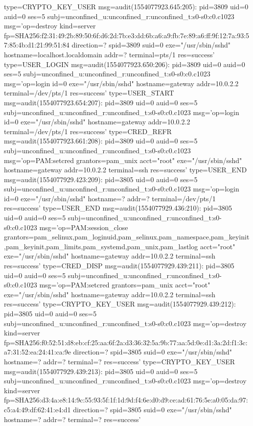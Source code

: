 \documentclass[]{report}
\newenvironment{Shaded}{}{}
\newcommand{\NormalTok}[1]{#1}
\begin{document}
\begin{Shaded}
\begin{Highlighting}[]
\NormalTok{type=CRYPTO_KEY_USER msg=audit(1554077923.645:205): pid=3809 uid=0 auid=0 ses=5 subj=unconfined_u:unconfined_r:unconfined_t:s0-s0:c0.c1023 msg='op=destroy kind=server fp=SHA256:f2:31:49:2b:89:50:6f:d6:2d:7b:e3:dd:6b:a6:a9:fb:7e:89:a6:ff:9f:12:7a:93:57:85:4b:d1:21:99:51:84 direction=? spid=3809 suid=0  exe="/usr/sbin/sshd" hostname=localhost.localdomain addr=? terminal=pts/1 res=success'}
\NormalTok{type=USER_LOGIN msg=audit(1554077923.650:206): pid=3809 uid=0 auid=0 ses=5 subj=unconfined_u:unconfined_r:unconfined_t:s0-s0:c0.c1023 msg='op=login id=0 exe="/usr/sbin/sshd" hostname=gateway addr=10.0.2.2 terminal=/dev/pts/1 res=success'}
\NormalTok{type=USER_START msg=audit(1554077923.654:207): pid=3809 uid=0 auid=0 ses=5 subj=unconfined_u:unconfined_r:unconfined_t:s0-s0:c0.c1023 msg='op=login id=0 exe="/usr/sbin/sshd" hostname=gateway addr=10.0.2.2 terminal=/dev/pts/1 res=success'}
\NormalTok{type=CRED_REFR msg=audit(1554077923.661:208): pid=3809 uid=0 auid=0 ses=5 subj=unconfined_u:unconfined_r:unconfined_t:s0-s0:c0.c1023 msg='op=PAM:setcred grantors=pam_unix acct="root" exe="/usr/sbin/sshd" hostname=gateway addr=10.0.2.2 terminal=ssh res=success'}
\NormalTok{type=USER_END msg=audit(1554077929.423:209): pid=3805 uid=0 auid=0 ses=5 subj=unconfined_u:unconfined_r:unconfined_t:s0-s0:c0.c1023 msg='op=login id=0 exe="/usr/sbin/sshd" hostname=? addr=? terminal=/dev/pts/1 res=success'}
\NormalTok{type=USER_END msg=audit(1554077929.436:210): pid=3805 uid=0 auid=0 ses=5 subj=unconfined_u:unconfined_r:unconfined_t:s0-s0:c0.c1023 msg='op=PAM:session_close grantors=pam_selinux,pam_loginuid,pam_selinux,pam_namespace,pam_keyinit,pam_keyinit,pam_limits,pam_systemd,pam_unix,pam_lastlog acct="root" exe="/usr/sbin/sshd" hostname=gateway addr=10.0.2.2 terminal=ssh res=success'}
\NormalTok{type=CRED_DISP msg=audit(1554077929.439:211): pid=3805 uid=0 auid=0 ses=5 subj=unconfined_u:unconfined_r:unconfined_t:s0-s0:c0.c1023 msg='op=PAM:setcred grantors=pam_unix acct="root" exe="/usr/sbin/sshd" hostname=gateway addr=10.0.2.2 terminal=ssh res=success'}
\NormalTok{type=CRYPTO_KEY_USER msg=audit(1554077929.439:212): pid=3805 uid=0 auid=0 ses=5 subj=unconfined_u:unconfined_r:unconfined_t:s0-s0:c0.c1023 msg='op=destroy kind=server fp=SHA256:f0:52:51:d8:eb:cf:25:aa:6f:2a:d3:36:32:5a:9b:77:aa:5d:0e:d1:3a:2d:f1:3c:a7:31:52:ea:24:41:ca:9e direction=? spid=3805 suid=0  exe="/usr/sbin/sshd" hostname=? addr=? terminal=? res=success'}
\NormalTok{type=CRYPTO_KEY_USER msg=audit(1554077929.439:213): pid=3805 uid=0 auid=0 ses=5 subj=unconfined_u:unconfined_r:unconfined_t:s0-s0:c0.c1023 msg='op=destroy kind=server fp=SHA256:d3:4a:e8:14:9c:55:93:5f:1f:1d:9d:f4:6e:d0:d9:ce:ad:61:76:5e:a0:05:da:97:c5:a4:49:df:62:41:e4:d1 direction=? spid=3805 suid=0  exe="/usr/sbin/sshd" hostname=? addr=? terminal=? res=success'}

\end{Highlighting}
\end{Shaded}
\end{document}
